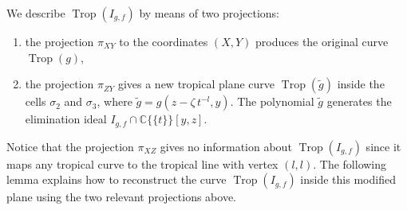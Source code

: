 \documentclass[11pt]{amsart}
\numberwithin{equation}{section}
\theoremstyle{plain}
\theoremstyle{definition}
\theoremstyle{remark}
\begin{document}
We describe $\operatorname{Trop}(I_{g,f})$ by means of two projections:
\begin{enumerate}
\item the projection $\pi_{XY}$ to the coordinates $(X,Y)$ produces the
  original curve $\operatorname{Trop}(g)$,
\item the projection $\pi_{ZY}$ gives a new tropical plane curve
  $\operatorname{Trop}(\tilde{g})$ inside the cells $\sigma_2$ and $\sigma_3$, where
  $\tilde{g}=g(z-{\zeta}\,t^{-l},y)$. The polynomial $\tilde{g}$ generates the
elimination ideal $I_{g,f}\cap {{\mathbb{C}}\{\!\{t
\}\!\}}[y,z]$.
\end{enumerate}
Notice that the projection $\pi_{XZ}$ gives no information about $\operatorname{Trop}(I_{g,f})$ since it maps any
tropical curve to the tropical line with vertex $(l,l)$.
The following lemma explains how to reconstruct the curve
$\operatorname{Trop}(I_{g,f})$ inside this modified plane using
the two relevant projections above.
\end{document}
